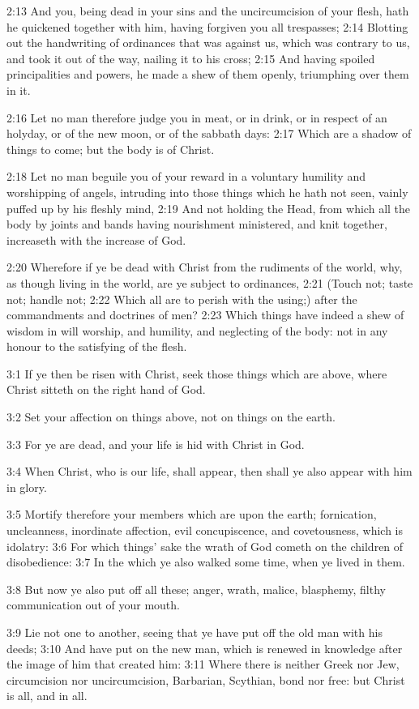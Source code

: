 2:13 And you, being dead in your sins and the uncircumcision of your flesh, hath he quickened together with him, having forgiven you all trespasses; 2:14 Blotting out the handwriting of ordinances that was against us, which was contrary to us, and took it out of the way, nailing it to his cross; 2:15 And having spoiled principalities and powers, he made a shew of them openly, triumphing over them in it.

2:16 Let no man therefore judge you in meat, or in drink, or in respect of an holyday, or of the new moon, or of the sabbath days: 2:17 Which are a shadow of things to come; but the body is of Christ.

2:18 Let no man beguile you of your reward in a voluntary humility and worshipping of angels, intruding into those things which he hath not seen, vainly puffed up by his fleshly mind, 2:19 And not holding the Head, from which all the body by joints and bands having nourishment ministered, and knit together, increaseth with the increase of God.

2:20 Wherefore if ye be dead with Christ from the rudiments of the world, why, as though living in the world, are ye subject to ordinances, 2:21 (Touch not; taste not; handle not; 2:22 Which all are to perish with the using;) after the commandments and doctrines of men?  2:23 Which things have indeed a shew of wisdom in will worship, and humility, and neglecting of the body: not in any honour to the satisfying of the flesh.

3:1 If ye then be risen with Christ, seek those things which are above, where Christ sitteth on the right hand of God.

3:2 Set your affection on things above, not on things on the earth.

3:3 For ye are dead, and your life is hid with Christ in God.

3:4 When Christ, who is our life, shall appear, then shall ye also appear with him in glory.

3:5 Mortify therefore your members which are upon the earth; fornication, uncleanness, inordinate affection, evil concupiscence, and covetousness, which is idolatry: 3:6 For which things' sake the wrath of God cometh on the children of disobedience: 3:7 In the which ye also walked some time, when ye lived in them.

3:8 But now ye also put off all these; anger, wrath, malice, blasphemy, filthy communication out of your mouth.

3:9 Lie not one to another, seeing that ye have put off the old man with his deeds; 3:10 And have put on the new man, which is renewed in knowledge after the image of him that created him: 3:11 Where there is neither Greek nor Jew, circumcision nor uncircumcision, Barbarian, Scythian, bond nor free: but Christ is all, and in all.

